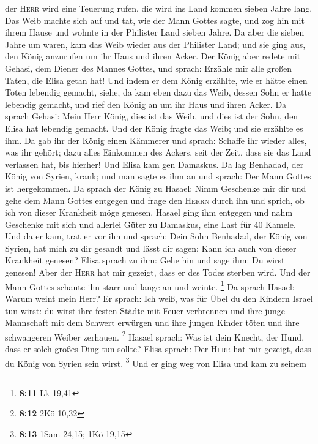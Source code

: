 der \textsc{Herr} wird eine Teuerung rufen, die wird ins Land kommen
sieben Jahre lang.  Das Weib machte sich auf und tat, wie
der Mann Gottes sagte, und zog hin mit ihrem Hause und wohnte in der
Philister Land sieben Jahre.  Da aber die sieben Jahre um
waren, kam das Weib wieder aus der Philister Land; und sie ging aus, den
König anzurufen um ihr Haus und ihren Acker.  Der König
aber redete mit Gehasi, dem Diener des Mannes Gottes, und sprach:
Erzähle mir alle großen Taten, die Elisa getan hat!  Und
indem er dem König erzählte, wie er hätte einen Toten lebendig gemacht,
siehe, da kam eben dazu das Weib, dessen Sohn er hatte lebendig gemacht,
und rief den König an um ihr Haus und ihren Acker. Da sprach Gehasi:
Mein Herr König, dies ist das Weib, und dies ist der Sohn, den Elisa hat
lebendig gemacht.  Und der König fragte das Weib; und sie
erzählte es ihm. Da gab ihr der König einen Kämmerer und sprach: Schaffe
ihr wieder alles, was ihr gehört; dazu alles Einkommen des Ackers, seit
der Zeit, dass sie das Land verlassen hat, bis hierher! 
Und Elisa kam gen Damaskus. Da lag Benhadad, der König von Syrien,
krank; und man sagte es ihm an und sprach: Der Mann Gottes ist
hergekommen.  Da sprach der König zu Hasael: Nimm
Geschenke mir dir und gehe dem Mann Gottes entgegen und frage den
\textsc{Herrn} durch ihn und sprich, ob ich von dieser Krankheit möge
genesen.  Hasael ging ihm entgegen und nahm Geschenke mit
sich und allerlei Güter zu Damaskus, eine Last für 40 Kamele. Und da er
kam, trat er vor ihn und sprach: Dein Sohn Benhadad, der König von
Syrien, hat mich zu dir gesandt und lässt dir sagen: Kann ich auch von
dieser Krankheit genesen?  Elisa sprach zu ihm: Gehe hin
und sage ihm: Du wirst genesen! Aber der \textsc{Herr} hat mir gezeigt,
dass er des Todes sterben wird.  Und der Mann Gottes
schaute ihn starr und lange an und weinte. \footnote{\textbf{8:11} Lk
  19,41}  Da sprach Hasael: Warum weint mein Herr? Er
sprach: Ich weiß, was für Übel du den Kindern Israel tun wirst: du wirst
ihre festen Städte mit Feuer verbrennen und ihre junge Mannschaft mit
dem Schwert erwürgen und ihre jungen Kinder töten und ihre schwangeren
Weiber zerhauen. \footnote{\textbf{8:12} 2Kö 10,32} 
Hasael sprach: Was ist dein Knecht, der Hund, dass er solch großes Ding
tun sollte? Elisa sprach: Der \textsc{Herr} hat mir gezeigt, dass du
König von Syrien sein wirst. \footnote{\textbf{8:13} 1Sam 24,15; 1Kö
  19,15}  Und er ging weg von Elisa und kam zu seinem
